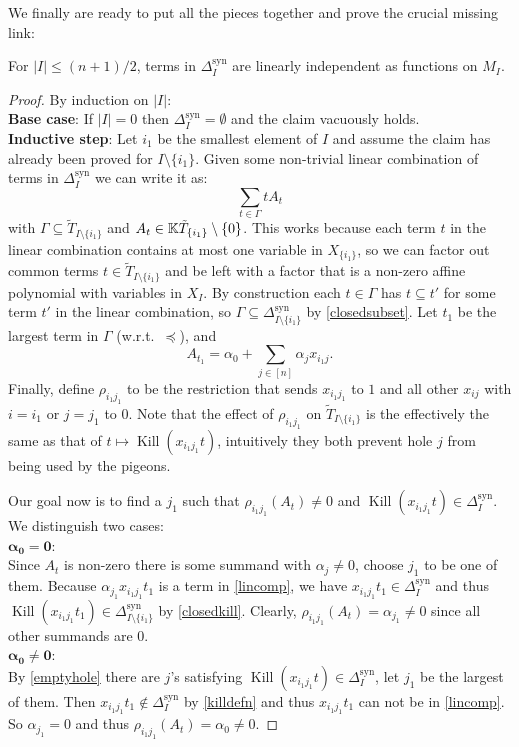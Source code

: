 \documentclass{article}
\newcommand{\Dsyn}{\Delta^\mathrm{syn}}
\renewcommand{\K}{\operatorname{Kill}}
\newcommand{\Is}{{I \setminus \{i_1\}}}
\newcommand{\rhoij}{\rho_{i_1 j_1}}
\newcommand{\xij}{{x_{i_1 j_1}}}
\begin{document}
We finally are ready to put all the pieces together and prove the crucial missing link:
\begin{theorem}
    For $|I| \leq (n + 1) / 2$, terms in $\Dsyn_I$ are linearly independent as functions on $M_I$.
\end{theorem}
\begin{proof}
    By induction on $|I|$:\\
    \textbf{Base case}: If $|I| = 0$ then $\Dsyn_I = \emptyset$ and the claim vacuously holds.\\
    \textbf{Inductive step}: Let $i_1$ be the smallest element of $I$ and assume the claim has already been proved for $\Is$. Given some non-trivial linear combination of terms in $\Dsyn_I$ we can write it as:
    \begin{equation} \label{lincomp}
        \sum_{t \in \Gamma} t A_t
    \end{equation}
    with $\Gamma \subseteq \tilde T_\Is$ and $A_t \in \mathbb{K} \tilde T_{\{i_1\}} \setminus \{0\}$. This works because each term $t$ in the linear combination contains at most one variable in $X_{\{i_1\}}$, so we can factor out common terms $t \in \tilde T_\Is$ and be left with a factor that is a non-zero affine polynomial with variables in $X_I$. By construction each $t \in \Gamma$ has $t \subseteq t'$ for some term $t'$ in the linear combination, so $\Gamma \subseteq \Dsyn_\Is$ by \autoref{closedsubset}. Let $t_1$ be the largest term in $\Gamma$ (w.r.t.\ $\preceq$), and
    $$A_{t_1} = \alpha_0 + \sum_{j \in [n]} \alpha_j x_{i_1 j}.$$
    Finally, define $\rhoij$ to be the restriction that sends $x_{i_1 j_1}$ to $1$ and all other $x_{i j}$ with $i = i_1$ or $j = j_1$ to $0$. Note that the effect of $\rhoij$ on $\tilde T_\Is$ is the effectively the same as that of $t \mapsto \K(x_{i_1 j_1} t)$, intuitively they both prevent hole $j$ from being used by the pigeons.
    
    Our goal now is to find a $j_1$ such that $\rhoij(A_t) \neq 0$ and $\K(x_{i_1 j_1} t) \in \Dsyn_I$. We distinguish two cases:\\
    $\mathbf{\alpha_0 = 0}$:\\
    Since $A_t$ is non-zero there is some summand with $\alpha_j \neq 0$, choose $j_1$ to be one of them. Because $\alpha_{j_1} \xij t_1$ is a term in \eqref{lincomp}, we have $\xij t_1 \in \Dsyn_I$ and thus $\K(\xij t_1) \in \Dsyn_\Is$ by \autoref{closedkill}. Clearly, $\rhoij(A_t) = \alpha_{j_1} \neq 0$ since all other summands are $0$.\\
    $\mathbf{\alpha_0 \neq 0}$:\\
    By \autoref{emptyhole} there are $j$'s satisfying $\K(x_{i_1 j_1} t) \in \Dsyn_I$, let $j_1$ be the largest of them. Then $\xij t_1 \not\in \Dsyn_I$ by \autoref{killdefn} and thus $\xij t_1$ can not be in \eqref{lincomp}. So $\alpha_{j_1} = 0$ and thus $\rhoij(A_t) = \alpha_0 \neq 0$.


\end{proof}
\end{document}
